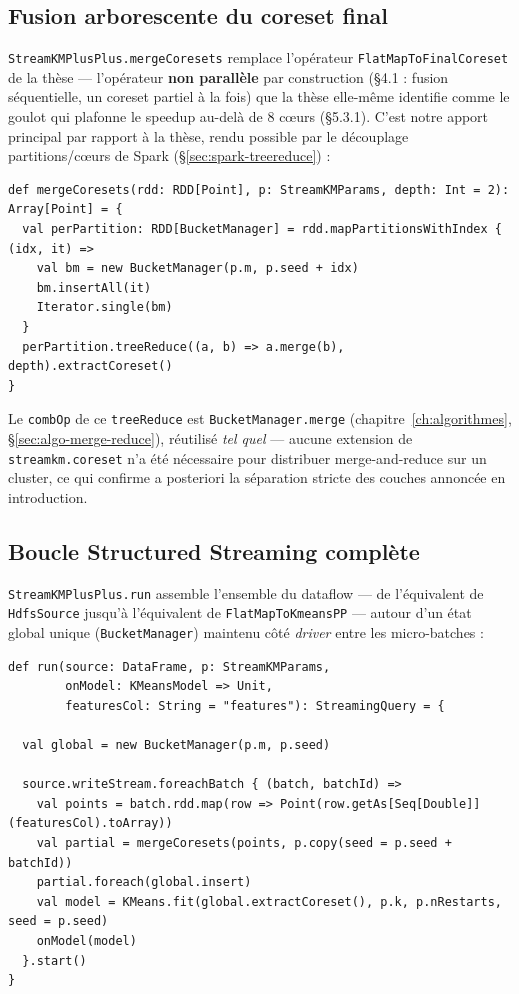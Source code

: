 \subsection{Fusion arborescente du coreset final}

\texttt{StreamKMPlusPlus.mergeCoresets} remplace l'opérateur
\texttt{FlatMapToFinalCoreset} de la thèse --- l'opérateur \textbf{non
parallèle} par construction (§4.1 : fusion séquentielle, un coreset partiel
à la fois) que la thèse elle-même identifie comme le goulot qui plafonne le
speedup au-delà de 8 c\oe{}urs (§5.3.1). C'est notre apport principal par
rapport à la thèse, rendu possible par le découplage partitions/c\oe{}urs de
Spark (§\ref{sec:spark-treereduce}) :

\begin{verbatim}
def mergeCoresets(rdd: RDD[Point], p: StreamKMParams, depth: Int = 2): Array[Point] = {
  val perPartition: RDD[BucketManager] = rdd.mapPartitionsWithIndex { (idx, it) =>
    val bm = new BucketManager(p.m, p.seed + idx)
    bm.insertAll(it)
    Iterator.single(bm)
  }
  perPartition.treeReduce((a, b) => a.merge(b), depth).extractCoreset()
}
\end{verbatim}

Le \texttt{combOp} de ce \texttt{treeReduce} est \texttt{BucketManager.merge}
(chapitre~\ref{ch:algorithmes}, §\ref{sec:algo-merge-reduce}), réutilisé
\emph{tel quel} --- aucune extension de \texttt{streamkm.coreset} n'a été
nécessaire pour distribuer merge-and-reduce sur un cluster, ce qui confirme
a posteriori la séparation stricte des couches annoncée en introduction.

\subsection{Boucle Structured Streaming complète}

\texttt{StreamKMPlusPlus.run} assemble l'ensemble du dataflow --- de
l'équivalent de \texttt{HdfsSource} jusqu'à l'équivalent de
\texttt{FlatMapToKmeansPP} --- autour d'un état global unique
(\texttt{BucketManager}) maintenu côté \emph{driver} entre les micro-batches :

\begin{verbatim}
def run(source: DataFrame, p: StreamKMParams,
        onModel: KMeansModel => Unit,
        featuresCol: String = "features"): StreamingQuery = {

  val global = new BucketManager(p.m, p.seed)

  source.writeStream.foreachBatch { (batch, batchId) =>
    val points = batch.rdd.map(row => Point(row.getAs[Seq[Double]](featuresCol).toArray))
    val partial = mergeCoresets(points, p.copy(seed = p.seed + batchId))
    partial.foreach(global.insert)
    val model = KMeans.fit(global.extractCoreset(), p.k, p.nRestarts, seed = p.seed)
    onModel(model)
  }.start()
}
\end{verbatim}


